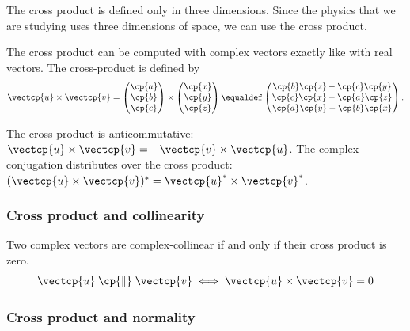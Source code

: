 The cross product is defined only in three dimensions.
Since the physics that we are studying uses three dimensions of space, we can use the cross product.

The cross product can be computed with complex vectors exactly like with real vectors.
The cross-product is defined by
\begin{equation}
    \vectcp{u} \times \vectcp{v}
    =
    \begin{pmatrix}
        \cp{a} \\ \cp{b} \\ \cp{c}
    \end{pmatrix}
    \times
    \begin{pmatrix}
        \cp{x} \\ \cp{y} \\ \cp{z}
    \end{pmatrix}
    \equaldef
    \begin{pmatrix}
        \cp{b}\cp{z} - \cp{c}\cp{y}\\
        \cp{c}\cp{x} - \cp{a}\cp{z}\\
        \cp{a}\cp{y} - \cp{b}\cp{x}
    \end{pmatrix}
    \text{.}
\end{equation}

The cross product is anticommutative:
$\vectcp{u} \times \vectcp{v} = -\vectcp{v} \times \vectcp{u}$.
The complex conjugation distributes over the cross product:
$(\vectcp{u} \times \vectcp{v})^* = \vectcp{u}^* \times \vectcp{v}^*$.


\subsubsection{Cross product and collinearity}

    Two complex vectors are complex-collinear if and only if their cross product is zero.
\begin{equation}
    \vectcp{u} \;\cp{\parallel}\; \vectcp{v}  \iff   \vectcp{u} \times \vectcp{v} = 0
\end{equation}


\subsubsection{Cross product and normality}

